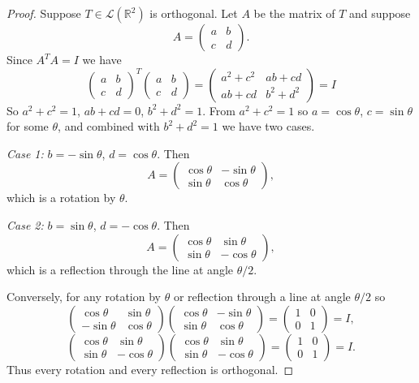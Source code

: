 \begin{proof}
    Suppose $T \in \mathcal{L}(\mathbb{R}^2)$ is orthogonal.
    Let $A$ be the matrix of $T$ and suppose 
    \[A = \begin{pmatrix}
        a & b \\ c & d
    \end{pmatrix}.\]
    Since $A^T A = I$ we have 
    \[\begin{pmatrix}a&b\\c&d\end{pmatrix}^T\begin{pmatrix}a&b\\c&d\end{pmatrix} 
    = \begin{pmatrix}a^2+c^2 & ab+cd \\ ab+cd & b^2+d^2\end{pmatrix} = I\]
    So $a^2 + c^2 = 1$, $ab + cd = 0$, $b^2 + d^2 = 1$.
    From $a^2 + c^2 = 1$ so $a = \cos\theta$, $c = \sin\theta$ for some $\theta$,
    and combined with $b^2 + d^2 = 1$ we have two cases.

    \textit{Case 1:} $b = -\sin\theta$, $d = \cos\theta$. Then
    \[A = \begin{pmatrix}\cos\theta & -\sin\theta \\ \sin\theta & \cos\theta\end{pmatrix},\]
    which is a rotation by $\theta$.

    \textit{Case 2:} $b = \sin\theta$, $d = -\cos\theta$. Then
    \[A = \begin{pmatrix}\cos\theta & \sin\theta \\ \sin\theta & -\cos\theta\end{pmatrix},\]
    which is a reflection through the line at angle $\theta/2$.

    Conversely, for any rotation by $\theta$ or reflection through a line at angle $\theta/2$
    so
    \[\begin{pmatrix}\cos\theta & \sin\theta \\ -\sin\theta & \cos\theta\end{pmatrix}
    \begin{pmatrix}\cos\theta & -\sin\theta \\ \sin\theta & \cos\theta\end{pmatrix}
    = \begin{pmatrix}1 & 0 \\ 0 & 1\end{pmatrix} = I,\]
    \[\begin{pmatrix}\cos\theta & \sin\theta \\ \sin\theta & -\cos\theta\end{pmatrix}
    \begin{pmatrix}\cos\theta & \sin\theta \\ \sin\theta & -\cos\theta\end{pmatrix}
    = \begin{pmatrix}1 & 0 \\ 0 & 1\end{pmatrix} = I.\]
    Thus every rotation and every reflection is orthogonal.
\end{proof}


